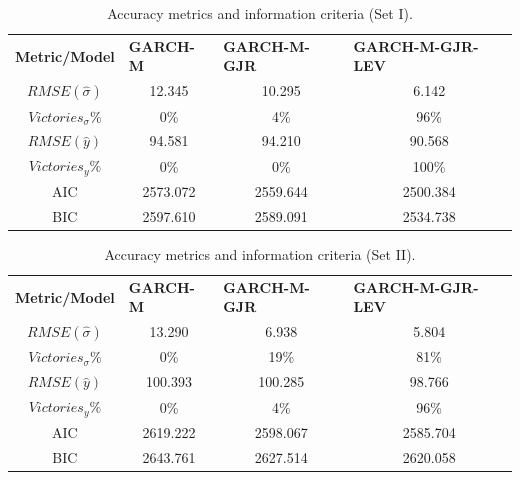 \documentclass[authoryear, 1p]{elsarticle}
\numberwithin{equation}{section}
\begin{document}
\begin{table}[h!]
\centering
\caption{Accuracy metrics and information criteria (Set I).}
\label{tab:tab_3}
\begin{tabular}{cccc}
\hline
\hline
\textbf{Metric/Model} & \multicolumn{1}{l}{\textbf{GARCH-M}} & \multicolumn{1}{l}{\textbf{GARCH-M-GJR}} & \multicolumn{1}{l}{\textbf{GARCH-M-GJR-LEV}} \\
$RMSE(\hat{\sigma})$           & 12.345       & 10.295       & 6.142        \\
$Victories_{\sigma} \%$        & 0\%          & 4\%          & 96\%         \\
$RMSE(\hat{y})$                & 94.581       & 94.210       & 90.568       \\
$Victories_{y} \%$             & 0\%          & 0\%          & 100\%        \\     
\hline

AIC                           & 2573.072     & 2559.644     & 2500.384           \\
BIC                           & 2597.610     & 2589.091     & 2534.738           \\
\hline
\hline
\end{tabular}
\end{table}

\begin{table}[h!]
\centering
\caption{Accuracy metrics and information criteria (Set II).}
\label{tab:tab_3_1}
\begin{tabular}{cccc}
\hline
\hline
\textbf{Metric/Model} & \multicolumn{1}{l}{\textbf{GARCH-M}} & \multicolumn{1}{l}{\textbf{GARCH-M-GJR}} & \multicolumn{1}{l}{\textbf{GARCH-M-GJR-LEV}} \\
$RMSE(\hat{\sigma})$          & 13.290       & 6.938        & 5.804              \\
$Victories_{\sigma} \%$       & 0\%          & 19\%         & 81\%               \\
$RMSE(\hat{y})$               & 100.393      & 100.285      & 98.766             \\
$Victories_{y} \%$            & 0\%          & 4\%          & 96\%               \\
\hline

AIC                           & 2619.222     & 2598.067     & 2585.704           \\
BIC                           & 2643.761     & 2627.514     & 2620.058           \\
\hline
\hline
\end{tabular}
\end{table}
\end{document}
